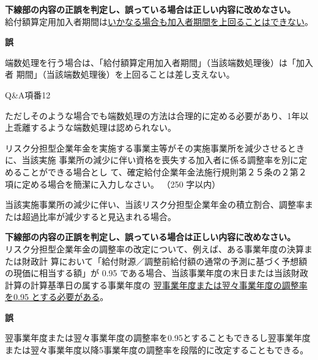 \begin{truefalse}[年金1 2024 問題1(3)ア]
      \textbf{下線部の内容の正誤を判定し、誤っている場合は正しい内容に改めなさい。}
  \\

  給付額算定用加入者期間は\underline{いかなる場合も加入者期間を上回ることはできない}。
\end{truefalse}

\begin{answerbox}
\textbf{誤}

  端数処理を行う場合は、「給付額算定用加入者期間」（当該端数処理後）は「加入者
期間」（当該端数処理後）を上回ることは差し支えない。
\end{answerbox}

\begin{explanationbox}
  Q\&A項番12

  ただしそのような場合でも端数処理の方法は合理的に定める必要があり、1年以上乖離するような端数処理は認められない。
\end{explanationbox}

\begin{shortanswer}[年金1 2023 問題2(1)イ]
  リスク分担型企業年金を実施する事業主等がその実施事業所を減少させるときに、当該実施
事業所の減少に伴い資格を喪失する加入者に係る調整率を別に定めることができる場合とし
て、確定給付企業年金法施行規則第２５条の２第２項に定める場合を簡潔に入力しなさい。
（250 字以内）
\end{shortanswer}

\begin{answerbox}
  当該実施事業所の減少に伴い、当該リスク分担型企業年金の積立割合、調整率または超過比率が減少すると見込まれる場合。
\end{answerbox}

\begin{truefalse}[年金1 2021 問題1(3)\textcircled{3}]
      \textbf{下線部の内容の正誤を判定し、誤っている場合は正しい内容に改めなさい。}
  \\

リスク分担型企業年金の調整率の改定について、例えば、ある事業年度の決算または財政計
算において「給付財源／調整前給付額の通常の予測に基づく予想額の現価に相当する額」が
0.95 である場合、当該事業年度の末日または当該財政計算の計算基準日の属する事業年度の
\underline{翌事業年度または翌々事業年度の調整率を0.95 とする必要がある}。
\end{truefalse}

\begin{answerbox}
  \textbf{誤}

  翌事業年度または翌々事業年度の調整率を0.95とすることもできるし翌事業年度または翌々事業年度以降5事業年度の調整率を段階的に改定することもできる。
\end{answerbox}

